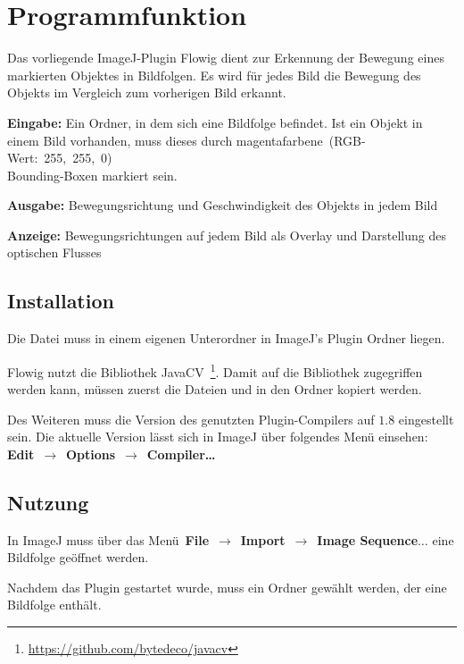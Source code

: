 
\chapter{Programmfunktion}\label{sec:Einleitung}
Das vorliegende ImageJ-Plugin Flowig dient zur Erkennung der Bewegung eines markierten Objektes in Bildfolgen. Es wird für jedes Bild die Bewegung des Objekts im Vergleich zum vorherigen Bild erkannt.

\textbf{Eingabe: } Ein Ordner, in dem sich eine Bildfolge befindet. Ist ein Objekt in einem Bild vorhanden, muss dieses durch magentafarbene~(RGB-Wert:~255,~255,~0)\\Bounding-Boxen markiert sein.


\textbf{Ausgabe: } Bewegungsrichtung und Geschwindigkeit des Objekts in jedem Bild


\textbf{Anzeige: } Bewegungsrichtungen auf jedem Bild als Overlay und Darstellung des optischen Flusses

\section{Installation}
Die Datei  muss in einem eigenen Unterordner  in ImageJ's Plugin Ordner liegen.

Flowig nutzt die Bibliothek JavaCV~\footnote{\url{https://github.com/bytedeco/javacv}}. Damit auf die Bibliothek zugegriffen werden kann, müssen zuerst die Dateien  und  in den Ordner  kopiert werden.

Des Weiteren muss die Version des genutzten Plugin-Compilers auf $1.8$ eingestellt sein. 
Die aktuelle Version lässt sich in ImageJ über folgendes Menü einsehen:\\
\mbox{\textbf{Edit}~$\rightarrow$~\textbf{Options}~$\rightarrow$~\textbf{Compiler\dots}} 

\section{Nutzung}

In ImageJ muss über das Menü~\textbf{File}~$\rightarrow$~\textbf{Import}~$\rightarrow$~\textbf{Image Sequence$\dots$} eine Bildfolge geöffnet werden. 

Nachdem das Plugin gestartet wurde, muss ein Ordner gewählt werden, der eine Bildfolge enthält.

